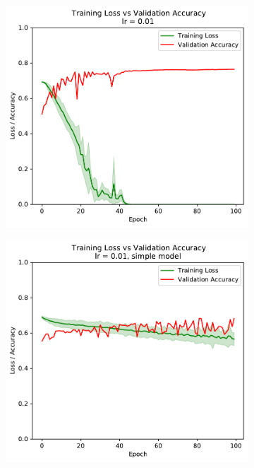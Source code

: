 \documentclass[sigconf,nonacm]{acmart}
\begin{document}
\begin{figure}[ht]
\begin{subfigure}[c]{0.3\columnwidth}
\includegraphics[width=\textwidth]{plot_0_01.pdf}
\end{subfigure}
\hspace{1pt}
\begin{subfigure}[c]{0.3\columnwidth}
\includegraphics[width=\textwidth]{plot_simple_0_01.pdf}

\end{subfigure}
\end{figure}
\end{document}
